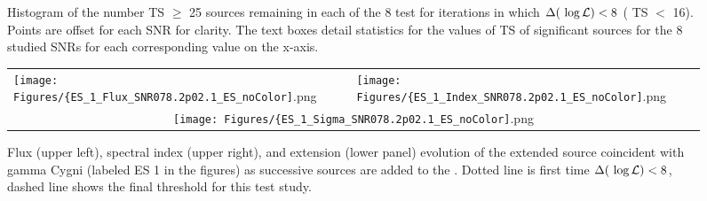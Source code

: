 \begin{figure}[ht!]
	\centering
	\caption[Histogram of the number of signiciant soures remaining in each of the 8 test \roi{} for iterations in which $\Delta(\logL) < 8$]{Histogram of the number TS $\geq$ 25 sources remaining in each of the 8 test \roi{} for iterations in which $\Delta(\logL) < 8$ (\ie{} TS $<$ 16). Points are offset for each SNR for clarity. The text boxes detail statistics for the values of TS of significant sources for the 8 studied SNRs for each corresponding value on the x-axis.}
	\label{fig:NTSthresh}
\end{figure}

\begin{figure}[ht]
	\begin{center}
		\hspace*{-1.5cm} \begin{tabular}{ll}
			\texttt{[image: Figures/\{ES\_1\_Flux\_SNR078.2p02.1\_ES\_noColor]}.png} &
			\texttt{[image: Figures/\{ES\_1\_Index\_SNR078.2p02.1\_ES\_noColor]}.png} \\
			\multicolumn{2}{c}{\texttt{[image: Figures/\{ES\_1\_Sigma\_SNR078.2p02.1\_ES\_noColor]}.png}}\\
		\end{tabular}
	\end{center}
	\caption[SNR Gamma Cygni flux, index, and extension evolution for successive \srcs{} iterations]{
		\label{fig:gamCygEvo}{Flux (upper left), \pl{} spectral index (upper right), and extension (lower panel) evolution of the extended source coincident with \snr{} gamma Cygni (labeled ES 1 in the figures) as successive sources are added to the \roi{}.  Dotted line is first time $\Delta(\logL) < 8$, dashed line shows the final threshold for this test study.}
	}
\end{figure}


